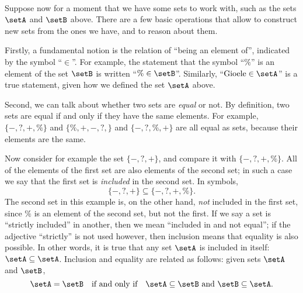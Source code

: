{

\

Suppose now for a moment that we have some sets to work with, such as the sets $\setA$ and $\setB$ above. There are a few basic operations that allow to construct new sets from the ones we have, and to reason about them. 


Firstly, a fundamental notion is the relation of ``being an element of'', indicated by the symbol ``$\in$''. For example, the statement that the symbol ``$\%$'' is an element of the set $\setB$ is written ``$\% \in \setB$''. Similarly, ``$\text{Gioele} \in \setA$'' is a true statement, given how we defined the set $\setA$ above. 

Second, we can talk about whether two sets are \emph{equal} or not. By definition, two sets are equal if and only if they have the same elements. For example, $\{ -, ?, +, \% \}$ and $\{ \%, +, -, ?, \}$ and $\{ -, ?, \%, + \}$ are all equal as sets, because their elements are the same. 

Now consider for example the set $\{ -, ?, + \}$, and compare it with $\{ -, ?, +, \% \}$. All of the elements of the first set are also elements of the second set; in such a case we say that the first set is \emph{included} in the second set. In symbols,
\begin{equation}
\{ -, ?, + \} \subseteq \{ -, ?, +, \% \}. 
\end{equation}
The second set in this example is, on the other hand, \emph{not} included in the first set, since $\%$ is an element of the second set, but not the first. If we say a set is ``strictly included'' in another, then we mean ``included in and not equal''; if the adjective ``strictly'' is not used however, then inclusion means that equality is also possible. In other words, it is true that any set $\setA$ is included in itself: $\setA \subseteq \setA$. Inclusion and equality are related as follows: given sets $\setA$ and $\setB$, 
\begin{equation}
\setA = \setB \quad \text{if and only if} \quad \setA \subseteq \setB \ \text{and} \ \setB \subseteq \setA.
\end{equation}


\

\



}
